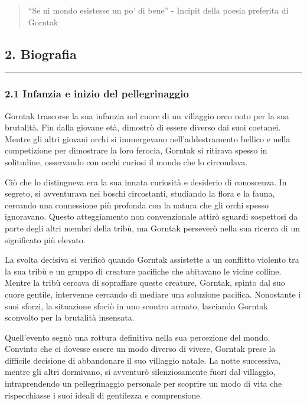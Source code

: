 \begin{quote}
``Se ni mondo esistesse un po' di bene'' - Incipit della poesia
preferita di Gorntak
\end{quote}

\subsection{2. Biografia}\label{biografia}

\begin{center}\rule{0.5\linewidth}{0.5pt}\end{center}

\subsubsection{2.1 Infanzia e inizio del
pellegrinaggio}\label{infanzia-e-inizio-del-pellegrinaggio}

Gorntak trascorse la sua infanzia nel cuore di un villaggio orco noto
per la sua brutalità. Fin dalla giovane età, dimostrò di essere diverso
dai suoi coetanei. Mentre gli altri giovani orchi si immergevano
nell'addestramento bellico e nella competizione per dimostrare la loro
ferocia, Gorntak si ritirava spesso in solitudine, osservando con occhi
curiosi il mondo che lo circondava.

Ciò che lo distingueva era la sua innata curiosità e desiderio di
conoscenza. In segreto, si avventurava nei boschi circostanti, studiando
la flora e la fauna, cercando una connessione più profonda con la natura
che gli orchi spesso ignoravano. Questo atteggiamento non convenzionale
attirò sguardi sospettosi da parte degli altri membri della tribù, ma
Gorntak perseverò nella sua ricerca di un significato più elevato.

La svolta decisiva si verificò quando Gorntak assistette a un conflitto
violento tra la sua tribù e un gruppo di creature pacifiche che
abitavano le vicine colline. Mentre la tribù cercava di sopraffare
queste creature, Gorntak, spinto dal suo cuore gentile, intervenne
cercando di mediare una soluzione pacifica. Nonostante i suoi sforzi, la
situazione sfociò in uno scontro armato, lasciando Gorntak sconvolto per
la brutalità insensata.

Quell'evento segnò una rottura definitiva nella sua percezione del
mondo. Convinto che ci dovesse essere un modo diverso di vivere, Gorntak
prese la difficile decisione di abbandonare il suo villaggio natale. La
notte successiva, mentre gli altri dormivano, si avventurò
silenziosamente fuori dal villaggio, intraprendendo un pellegrinaggio
personale per scoprire un modo di vita che rispecchiasse i suoi ideali
di gentilezza e comprensione.


